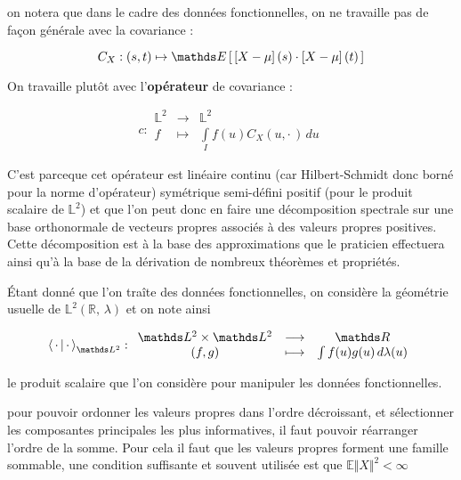 \begin{rem}
	on notera que dans le cadre des données fonctionnelles, on ne travaille pas de façon générale avec la covariance :

	$$C_X : (s,t) \mapsto \esperance{ \left[X - \mu\right](s) \cdot \left[X - \mu\right](t) }$$

	On travaille plutôt avec l'\textbf{opérateur} de covariance :

	\begin{equation*}
		c : \begin{array}{ccc}
			\mathds L^2 & \longrightarrow & \mathds L^2                             \\
			f           & \longmapsto     & \int\limits_I f(u)C_X(u, \cdot \,) \,du
		\end{array}
	\end{equation*}

	C'est parceque cet opérateur est linéaire continu (car Hilbert-Schmidt donc borné pour la norme d'opérateur) symétrique semi-défini positif (pour le produit scalaire de $\mathds L^2$) et que l'on peut donc en faire une décomposition spectrale sur une base orthonormale de vecteurs propres associés à des valeurs propres positives. Cette décomposition est à la base des approximations que le praticien effectuera ainsi qu'à la base de la dérivation de nombreux théorèmes et propriétés.
\end{rem}

\bigskip

Étant donné que l'on traîte des données fonctionnelles, on considère la géométrie usuelle de $\mathds L^2(\mathds R, \, \lambda)$ et on note ainsi

\begin{equation*}
	\prodscalselon \cdot \cdot {\mathds L^2}: \begin{array}{ccc}
		\mathds L^2 \times \mathds L^2 & \longrightarrow & \mathds R
		\\
		(f,g)                          & \longmapsto     & \int f(u)g(u) \, d\lambda(u)
	\end{array}
\end{equation*}


le produit scalaire que l'on considère pour manipuler les données fonctionnelles.



\begin{rem}
	pour pouvoir ordonner les valeurs propres dans l'ordre décroissant, et sélectionner les composantes principales les plus informatives, il faut pouvoir réarranger l'ordre de la somme. Pour cela il faut que les valeurs propres forment une famille sommable, une condition suffisante et souvent utilisée est que $\mathds E \Vert X \Vert^2 < \infty$
\end{rem}

